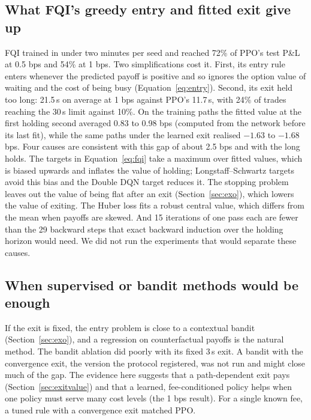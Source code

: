 \documentclass[12pt,a4paper]{article}
\DeclareRobustCommand{\bps}{\ifmmode\,\text{bps}\else\,bps\fi}
\begin{document}
\subsection{What FQI's greedy entry and fitted exit give up}
FQI trained in under two minutes per seed and reached 72\% of PPO's test P\&L at 0.5\bps{} and
54\% at 1\bps. Two simplifications cost it. First, its entry rule enters whenever the
predicted payoff is positive and so ignores the option value of waiting and the cost of being
busy (Equation~\eqref{eq:entry}). Second, its exit held too long: 21.5\,s on average at
1\bps{} against PPO's 11.7\,s, with 24\% of trades reaching the 30\,s limit against 10\%. On
the training paths the fitted value at the first holding second averaged 0.83 to 0.98\bps{}
(computed from the network before its last fit), while the same paths under the learned exit
realised $-1.63$ to $-1.68$\bps. Four causes are consistent with this gap of about 2.5\bps{}
and with the long holds. The targets in Equation~\eqref{eq:fqi} take a maximum over fitted
values, which is biased upwards and inflates the value of holding; Longstaff--Schwartz targets
avoid this bias and the Double DQN target reduces it. The stopping problem leaves out the value of being
flat after an exit (Section~\ref{sec:exo}), which lowers the value of exiting. The Huber loss
fits a robust central value, which differs from the mean when payoffs are skewed. And 15
iterations of one pass each are fewer than the 29 backward steps that exact backward
induction over the holding horizon would need. We did not run the experiments that would
separate these causes.

\subsection{When supervised or bandit methods would be enough}
If the exit is fixed, the entry problem is close to a contextual bandit
(Section~\ref{sec:exo}), and a regression on counterfactual payoffs is the natural method.
The bandit ablation did poorly with its fixed 3\,s exit. A bandit with the convergence exit,
the version the protocol registered, was not run and might close much of the gap. The
evidence here suggests that a path-dependent exit pays (Section~\ref{sec:exitvalue}) and that a learned,
fee-conditioned policy helps when one policy must serve many cost levels (the 1\bps{}
result). For a single known fee, a tuned rule with a convergence exit matched PPO.

\end{document}
